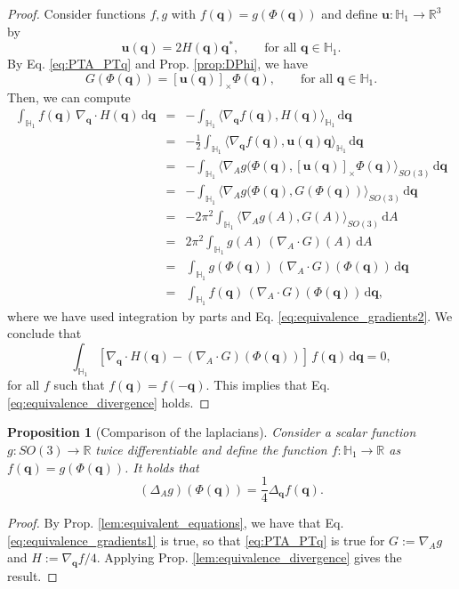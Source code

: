 \documentclass[12pt]{article}
\def\R{\mathbb{R}}
\def\to{\rightarrow}
\newtheorem{proposition}[theorem]{Proposition}
\newcommand{\beqar}{\begin{eqnarray*}}
\newcommand{\eeqar}{\end{eqnarray*}}
\newcommand{\uu}{\mathbf{u}}
\newcommand{\ud}{\mathrm{d}}
\newcommand{\unitq}{{\mathbb{H}_1}}
\newcommand{\q}{\mathbf{q}}
\begin{document}
\begin{proof}
Consider functions $f,g$ with $f(\q)=g(\Phi(\q))$ and define $\uu:\unitq\to \R^3$ by
$$\uu(\q)= 2 H(\q) \q^\ast,\qquad \text{for all }\q\in\unitq.$$
By Eq. \eqref{eq:PTA_PTq} and Prop. \ref{prop:DPhi}, we have
$$G(\Phi(\q)) = [\uu(\q)]_\times \Phi(\q),\qquad \text{for all }\q\in\unitq.$$
Then, we can compute
\beqar
\int_{\unitq} f(\q) \, \nabla_\q \cdot H(\q)\, \ud\q &=& -\int_{\unitq}\langle \nabla_\q f(\q) , H(\q)\rangle_{\unitq}\, \ud\q\\
&=& -\frac 12 \int_{\unitq}\langle \nabla_\q f(\q) , \uu(\q) \q \rangle_{\unitq}\, \ud\q\\
&=& - \int_{\unitq}\langle \nabla_A g(\Phi(\q) , [\uu(\q)]_\times \Phi(\q)\rangle_{SO(3)}\, \ud\q\\
&=& - \int_{\unitq}\langle \nabla_A g(\Phi(\q) , G( \Phi(\q))\rangle_{SO(3)}\, \ud\q\\
&=& -2 \pi^2\int_{\unitq}\langle \nabla_A g(A) , G(A)\rangle_{SO(3)}\, \ud A\\
&=& 2 \pi^2 \int_{\unitq}  g(A)\, (\nabla_A\cdot G)(A)\, \ud A\\
&=&\int_{\unitq}  g(\Phi(\q))\, (\nabla_A\cdot G)(\Phi(\q))\, \ud\q\\
&=&\int_{\unitq}  f(\q)\, (\nabla_A\cdot G)(\Phi(\q))\, \ud\q,
\eeqar
where we have used integration by parts and Eq. \eqref{eq:equivalence_gradients2}. We conclude that
$$\int_{\unitq}\left[ \nabla_\q \cdot H(\q)- (\nabla_A\cdot G)(\Phi(\q)) \right]\, f(\q) \, \ud\q=0,$$
for all $f$ such that $f(\q)=f(-\q)$. This implies that Eq. \eqref{eq:equivalence_divergence} holds.
\end{proof}


\begin{proposition}[Comparison of the laplacians]
\label{prop:laplacians}
Consider a scalar function $g: SO(3) \to \mathbb{R}$ twice differentiable and define the function $f: \unitq \to \mathbb{R}$ as $f(\q)= g(\Phi(\q))$. It holds that
$$(\Delta_A g) (\Phi(\q))= \frac{1}{4}\Delta_\q f (\q).$$
\end{proposition}


\begin{proof}
By Prop. \ref{lem:equivalent_equations}, we have that Eq. \eqref{eq:equivalence_gradients1} is true, so that \eqref{eq:PTA_PTq} is true for $G:= \nabla_A g$ and $H:=\nabla_\q f/4$. Applying Prop. \ref{lem:equivalence_divergence} gives the result.
\end{proof}
\end{document}
